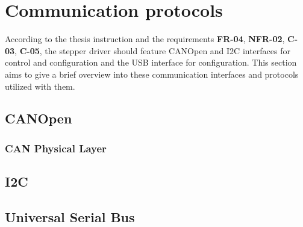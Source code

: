 \section{Communication protocols}
\label{sec:comm_protocols}
According to the thesis instruction and the requirements \textbf{FR-04}, \textbf{NFR-02}, \textbf{C-03}, \textbf{C-05},  the stepper driver should feature CANOpen and I2C interfaces for control and configuration and the USB interface for configuration.
This section aims to give a brief overview into these communication interfaces and protocols utilized with them.

\subsection{CANOpen}
\label{subsec:canopen}

\subsubsection{CAN Physical Layer}

\subsection{I2C}
\label{subsec:i2c}

\subsection{Universal Serial Bus}
\label{subsec:usb}
